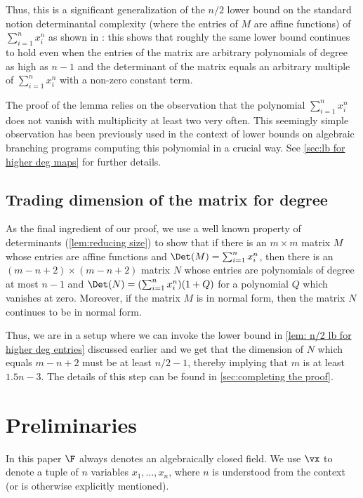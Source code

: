 Thus, this is a significant generalization of the $n/2$ lower bound on the standard notion determinantal complexity (where the entries of $M$ are affine functions) of $\sum_{i = 1}^n x_i^n$ as shown in \cite{K19}: this shows that roughly the same lower bound continues to hold even when the entries of the matrix are arbitrary polynomials of degree as high as $n-1$ and the determinant of the matrix equals an arbitrary multiple of $\sum_{i = 1}^n x_i^n$ with a non-zero constant term. 

The proof of the lemma relies on the observation that the polynomial $\sum_{i = 1}^n x_i^n$ does not vanish with multiplicity at least two very often. This seemingly simple observation has been previously used in the context of lower bounds on algebraic branching programs computing this polynomial \cite{K19, CKSV19} in a crucial way. See \autoref{sec:lb for higher deg maps} for further details. 


\subsection*{Trading dimension of the matrix for degree}
As the  final ingredient of our proof, we use  a well known property of determinants (\autoref{lem:reducing size}) to show that if there is an $m \times m$ matrix $M$ whose entries are affine functions and $\Det(M) = \sum_{i = 1}^n x_i^n$, then there is an  $(m - n + 2)\times (m-n + 2)$ matrix $N$  whose entries are polynomials of degree at most $n-1$ and $\Det(N) = (\sum_{i = 1}^n x_i^n)(1 + Q)$ for a polynomial $Q$ which vanishes at zero. Moreover, if the matrix $M$ is in normal form, then the matrix $N$ continues to be in normal form. 

Thus, we are in a setup where we can invoke the lower bound in \autoref{lem: n/2 lb for higher deg entries} discussed earlier and we get that the dimension of $N$ which equals $m - n + 2$ must be at least $n/2-1$, thereby implying that $m$ is at least $1.5n - 3$. The details of this step can be found in \autoref{sec:completing the proof}. 

\section{Preliminaries}\label{sec:prelim}
In this paper $\F$ always denotes an algebraically closed field. We use $\vx$ to denote a tuple of $n$ variables $x_1, \ldots, x_n$, where $n$ is understood from the context (or is otherwise explicitly mentioned).

